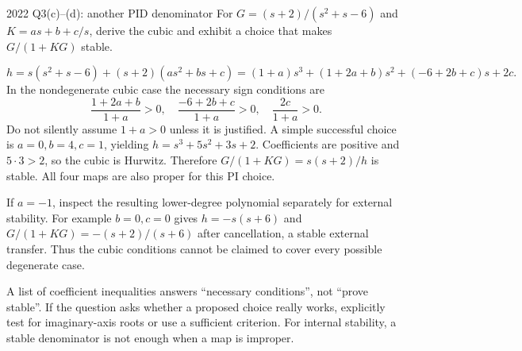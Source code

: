 \begin{question}{2022 Q3(c)--(d): another PID denominator}
For $G=(s+2)/(s^2+s-6)$ and $K=as+b+c/s$, derive the cubic and exhibit a choice that makes $G/(1+KG)$ stable.
\end{question}
\begin{answer}
\[h=s(s^2+s-6)+(s+2)(as^2+bs+c)
=(1+a)s^3+(1+2a+b)s^2+(-6+2b+c)s+2c.\]
In the nondegenerate cubic case the necessary sign conditions are
\[\frac{1+2a+b}{1+a}>0,\quad\frac{-6+2b+c}{1+a}>0,\quad\frac{2c}{1+a}>0.\]
Do not silently assume $1+a>0$ unless it is justified. A simple successful choice is $a=0,b=4,c=1$, yielding $h=s^3+5s^2+3s+2$. Coefficients are positive and $5\cdot3>2$, so the cubic is Hurwitz. Therefore $G/(1+KG)=s(s+2)/h$ is stable. All four maps are also proper for this PI choice.

If $a=-1$, inspect the resulting lower-degree polynomial separately for external stability. For example $b=0,c=0$ gives $h=-s(s+6)$ and $G/(1+KG)=-(s+2)/(s+6)$ after cancellation, a stable external transfer. Thus the cubic conditions cannot be claimed to cover every possible degenerate case.
\end{answer}
\begin{tip}
A list of coefficient inequalities answers ``necessary conditions'', not ``prove stable''. If the question asks whether a proposed choice really works, explicitly test for imaginary-axis roots or use a sufficient criterion. For internal stability, a stable denominator is not enough when a map is improper.
\end{tip}

